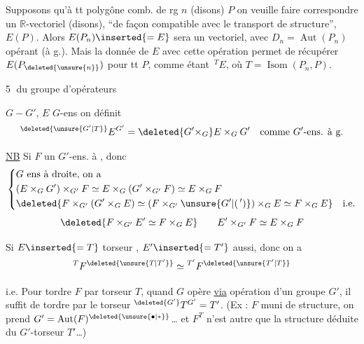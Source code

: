 Supposons qu'à tt polygône comb. de rg $n$ (disons) $P$ on veuille faire correspondre un $\mathbb{R}$-vectoriel  (disons), ``de façon compatible avec le transport de structure'',   $E(P)$. Alors $E(P_n)\inserted{=E}$ sera un vectoriel, avec $D_n=\operatorname{Aut}(P_n)$ opérant (à g.). Mais la donnée de $E$ avec cette opération permet de récupérer $E(P_{\deleted{\unsure{n}}})$ pour tt $P$, comme étant  $\,{}^TE$, où $T=\operatorname{Isom}(P_n,P)$.

\textcircled{5}  du groupe d'opérateurs

$G\mathrel{-}G'$, $E$ $G$-ens \unsure{,} on définit
\[
 {}^{\deleted{\unsure{G'|T}}}E^{G'}=\deleted{G'\times_G}E\times_G G'
 \quad\text{comme $G'$-ens. à g.}
\]

\uline{NB} Si $F$ un $G'$-ens. à , donc
\[
\left\{\begin{aligned}
 &G\text{ ens à droite, on a}\\
 &(E\times_G G')\times_{G'}F\simeq E\times_G(G'\times_{G'}F)\simeq E\times_G F\\
 &\deleted{F\times_{G'}(G'\times_G E)\simeq(F\times_{G'}\unsure{G'|(\,')})\times_G E\simeq F\times_G E}\quad\text{i.e.}
\end{aligned}\right.
\]
\[
 \deleted{F\times_{G'}E'\simeq F\times_G E}\qquad E'\times_{G'}F\simeq E\times_G F
\]

Si $E\inserted{=T}$ torseur , $E'\inserted{=T'}$ aussi, donc on a
\[
 {}^{T}F^{\deleted{\unsure{T|T'}}}\simeq{}^{T'}F^{\deleted{\unsure{T'|T}}}
\]

i.e. Pour tordre $F$ par torseur $T$, quand $G$ opère
\uline{via} opération d'un groupe $G'$, il suffit de tordre par le torseur ${}^{\deleted{G'}}T^{G'}=T'$. (Ex :  $F$ muni de  structure,  on prend $G'=\operatorname{Aut}(F)^{\deleted{\unsure{\bullet|\ast}}}$\ldots{} et $F^T$ n'est autre  que la structure déduite du $G'$-torseur $T'$\ldots)

